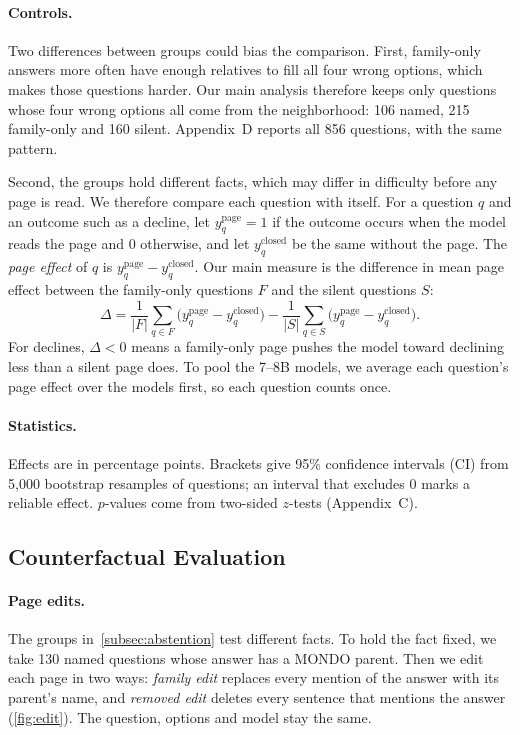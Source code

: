 \paragraph{Controls.}
Two differences between groups could bias the comparison. First, family-only answers more often have enough relatives to fill all four wrong options, which makes those questions harder. Our main analysis therefore keeps only questions whose four wrong options all come from the neighborhood: 106 named, 215 family-only and 160 silent. Appendix~D reports all 856 questions, with the same pattern.

Second, the groups hold different facts, which may differ in difficulty before any page is read. We therefore compare each question with itself. For a question $q$ and an outcome such as a decline, let $y_q^{\text{page}}=1$ if the outcome occurs when the model reads the page and $0$ otherwise, and let $y_q^{\text{closed}}$ be the same without the page. The \emph{page effect} of $q$ is $y_q^{\text{page}}-y_q^{\text{closed}}$. Our main measure is the difference in mean page effect between the family-only questions $F$ and the silent questions $S$:
{\setlength{\abovedisplayskip}{3pt}\setlength{\belowdisplayskip}{3pt}%
\begin{equation}
\Delta = \frac{1}{|F|}\sum_{q\in F}\bigl(y_q^{\text{page}}-y_q^{\text{closed}}\bigr) - \frac{1}{|S|}\sum_{q\in S}\bigl(y_q^{\text{page}}-y_q^{\text{closed}}\bigr).
\label{eq:did}
\end{equation}}
For declines, $\Delta<0$ means a family-only page pushes the model toward declining less than a silent page does. To pool the 7--8B models, we average each question's page effect over the models first, so each question counts once.

\paragraph{Statistics.}
Effects are in percentage points. Brackets give 95\% confidence intervals (CI) from 5,000 bootstrap resamples of questions; an interval that excludes \num{0} marks a reliable effect. $p$-values come from two-sided $z$-tests (Appendix~C).

\subsection{Counterfactual Evaluation}

\paragraph{Page edits.}
The groups in~\cref{subsec:abstention} test different facts. To hold the fact fixed, we take 130 named questions whose answer has a MONDO parent. Then we edit each page in two ways: \emph{family edit} replaces every mention of the answer with its parent's name, and \emph{removed edit} deletes every sentence that mentions the answer (\cref{fig:edit}). The question, options and model stay the same.


